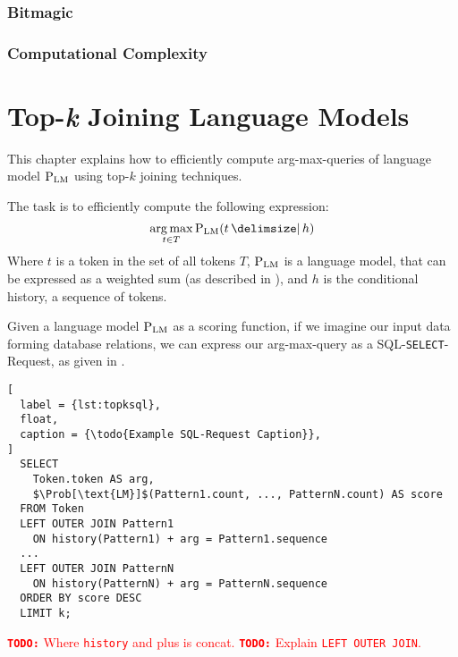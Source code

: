 \documentclass[m,bachelor,binding,palatino]{WeSTthesis}
\renewcommand\cref{\Cref}
\DeclareMathOperator*{\Argmax}{arg\,max}
\newcommand{\inlinecode}[1]{\lstinline[columns=fixed]{#1}}
\newcommand{\todo}[1]{\textcolor{red}{{\footnotesize\textbf{\texttt{TODO:}}} #1}}
\begin{document}
\clearpage


\subsection{Bitmagic}

\subsection{Computational Complexity}

\chapter{Top-\emph{k} Joining Language Models}
\label{ch:top-k-joining}


This chapter explains how to efficiently compute arg-max-queries of language
model $\Prob[\text{LM}]$ using top-$k$ joining techniques.

The task is to efficiently compute the following expression:
\begin{equation}
  \Argmax_{t \in T} \Prob[\text{LM}]{t}{h}
\end{equation}
Where $t$ is a token in the set of all tokens $T$, $\Prob[\text{LM}]$ is a
language model, that can be expressed as a weighted sum (as described in
\cref{ch:weightedsum}), and $h$ is the conditional history, a sequence
of tokens.

Given a language model $\Prob[\text{LM}]$ as a scoring function, if we
imagine our input data forming database relations, we can express our
arg-max-query as a SQL-\texttt{SELECT}-Request, as given in \cref{lst:topksql}.

\begin{lstlisting}[
  label = {lst:topksql},
  float,
  caption = {\todo{Example SQL-Request Caption}},
]
  SELECT
    Token.token AS arg,
    $\Prob[\text{LM}]$(Pattern1.count, ..., PatternN.count) AS score
  FROM Token
  LEFT OUTER JOIN Pattern1
    ON history(Pattern1) + arg = Pattern1.sequence
  ...
  LEFT OUTER JOIN PatternN
    ON history(PatternN) + arg = PatternN.sequence
  ORDER BY score DESC
  LIMIT k;
\end{lstlisting}

\todo{Where \inlinecode{history} and plus is concat.}
\todo{Explain \inlinecode{LEFT OUTER JOIN}.}
\end{document}
